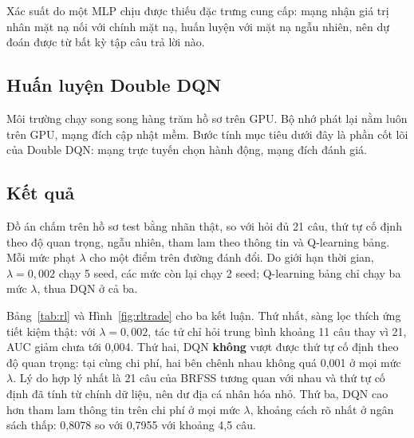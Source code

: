 Xác suất do một MLP chịu được thiếu đặc trưng cung cấp: mạng nhận giá trị nhân mặt nạ nối với chính mặt nạ, huấn luyện với mặt nạ ngẫu nhiên, nên dự đoán được từ bất kỳ tập câu trả lời nào.


\subsection{Huấn luyện Double DQN}

Môi trường chạy song song hàng trăm hồ sơ trên GPU. Bộ nhớ phát lại nằm luôn trên GPU, mạng đích cập nhật mềm. Bước tính mục tiêu dưới đây là phần cốt lõi của Double DQN: mạng trực tuyến chọn hành động, mạng đích đánh giá.


\subsection{Kết quả}

Đồ án chấm trên  hồ sơ test bằng nhãn thật, so với hỏi đủ 21 câu, thứ tự cố định theo độ quan trọng, ngẫu nhiên, tham lam theo thông tin và Q-learning bảng. Mỗi mức phạt $\lambda$ cho một điểm trên đường đánh đổi. Do giới hạn thời gian, $\lambda=0{,}002$ chạy 5 seed, các mức còn lại chạy 2 seed; Q-learning bảng chỉ chạy ba mức $\lambda$, thua DQN ở cả ba.

\begin{table}[!htbp]\centering\caption{DQN dừng thích ứng theo $\lambda$ trên test, so với AUC của hai đối chứng tại cùng chi phí}\label{tab:rl}
\small\setlength{\tabcolsep}{3.5pt}\end{table}


Bảng~\ref{tab:rl} và Hình~\ref{fig:rltrade} cho ba kết luận. Thứ nhất, sàng lọc thích ứng tiết kiệm thật: với $\lambda=0{,}002$, tác tử chỉ hỏi trung bình khoảng 11 câu thay vì 21, AUC giảm chưa tới 0,004. Thứ hai, DQN \textbf{không} vượt được thứ tự cố định theo độ quan trọng: tại cùng chi phí, hai bên chênh nhau không quá 0,001 ở mọi mức $\lambda$. Lý do hợp lý nhất là 21 câu của BRFSS tương quan với nhau và thứ tự cố định đã tính từ chính dữ liệu, nên dư địa cá nhân hóa nhỏ. Thứ ba, DQN cao hơn tham lam thông tin trên chi phí ở mọi mức $\lambda$, khoảng cách rõ nhất ở ngân sách thấp: 0,8078 so với 0,7955 với khoảng 4,5 câu.

